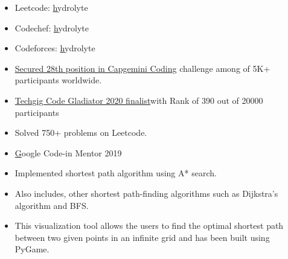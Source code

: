 
\begin{itemize}
    \item Leetcode: \href{https://leetcode.com/hydro_lyte/}hydrolyte
    \item Codechef: \href{https://www.codechef.com/users/hydro_ly_te}hydrolyte
    \item Codeforces: \href{https://codeforces.com/profile/hydro_lyte}hydrolyte
    
    
\end{itemize}

\begin{itemize}
    \item \href{https://techchallenge.in.capgemini.com/winners}{Secured 28th position in Capgemini Coding} challenge among of 5K+ participants worldwide.
    \item \href{https://www.techgig.com/codegladiators2020/finaleleaderboard}{Techgig Code Gladiator 2020 finalist}with Rank of 390 out of 20000 participants
    \item Solved 750+ problems on Leetcode.
    \item \href{https://drive.google.com/file/d/1fKLitzNLsrlvMymT-jfMIkWjSkZXA0Rp/view?usp=sharing}Google Code-in Mentor 2019
\end{itemize}








\begin{itemize}
\item Implemented shortest path algorithm using A* search.
\item Also includes, other shortest path-finding algorithms such as Dijkstra's
algorithm and BFS.
\item This visualization tool allows the users to find the optimal shortest
path between two given points in an infinite grid and has been built
using PyGame.
\end{itemize}


